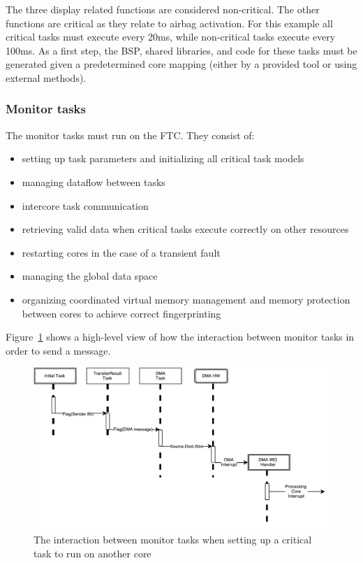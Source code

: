 \documentclass[table,11pt]{article}
\begin{document}
The three display related functions are considered non-critical. The other functions are critical as they relate to airbag activation. For this example all critical tasks must execute every 20ms, while non-critical tasks execute every 100ms. As a first step, the BSP, shared libraries, and code for these tasks must be generated given a predetermined core mapping (either by a provided tool or using external methods).


\subsubsection{Monitor tasks}
The monitor tasks must run on the FTC. They consist of:
\begin{itemize}
  \item setting up task parameters and initializing all critical task models
  \item managing dataflow between tasks 
  \item intercore task communication 
  \item retrieving valid data when critical tasks execute correctly on other resources 
  \item restarting cores in the case of a transient fault
  \item managing the global data space
  \item organizing coordinated virtual memory management and memory protection between cores to achieve correct fingerprinting
\end{itemize} 

Figure~\ref{f:monitor-send} shows a high-level view of how the interaction between monitor tasks in order to send a message.

\begin{figure}
\centering
\includegraphics[scale=0.7]{figures/monitor-send.pdf}
\caption{The interaction between monitor tasks when setting up a critical task to run on another core}
\label{f:monitor-send}
\end{figure}
\end{document}
